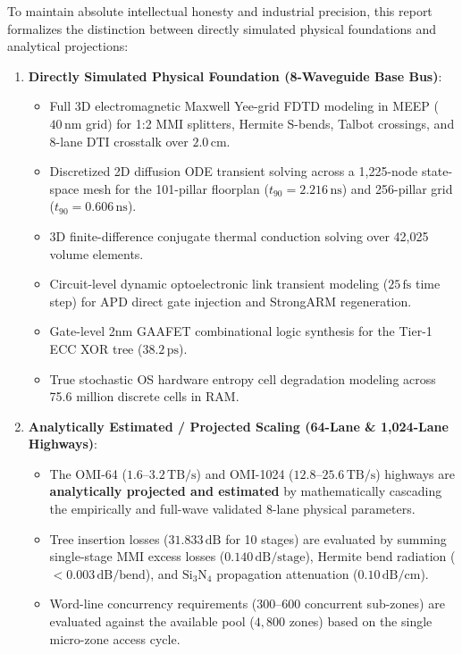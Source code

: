 \documentclass[journal]{IEEEtran}
\begin{document}
To maintain absolute intellectual honesty and industrial precision, this report formalizes the distinction between directly simulated physical foundations and analytical projections:
\begin{enumerate}
    \item \textbf{Directly Simulated Physical Foundation (8-Waveguide Base Bus)}:
    \begin{itemize}
        \item Full 3D electromagnetic Maxwell Yee-grid FDTD modeling in MEEP ($40\,\text{nm}$ grid) for 1:2 MMI splitters, Hermite S-bends, Talbot crossings, and 8-lane DTI crosstalk over $2.0\,\text{cm}$.
        \item Discretized 2D diffusion ODE transient solving across a 1,225-node state-space mesh for the 101-pillar floorplan ($t_{90} = 2.216\,\text{ns}$) and 256-pillar grid ($t_{90} = 0.606\,\text{ns}$).
        \item 3D finite-difference conjugate thermal conduction solving over 42,025 volume elements.
        \item Circuit-level dynamic optoelectronic link transient modeling ($25\,\text{fs}$ time step) for APD direct gate injection and StrongARM regeneration.
        \item Gate-level 2nm GAAFET combinational logic synthesis for the Tier-1 ECC XOR tree ($38.2\,\text{ps}$).
        \item True stochastic OS hardware entropy cell degradation modeling across 75.6 million discrete cells in RAM.
    \end{itemize}
    \item \textbf{Analytically Estimated / Projected Scaling (64-Lane \& 1,024-Lane Highways)}:
    \begin{itemize}
        \item The OMI-64 ($1.6\text{--}3.2\,\text{TB/s}$) and OMI-1024 ($12.8\text{--}25.6\,\text{TB/s}$) highways are \textbf{analytically projected and estimated} by mathematically cascading the empirically and full-wave validated 8-lane physical parameters.
        \item Tree insertion losses ($31.833\,\text{dB}$ for 10 stages) are evaluated by summing single-stage MMI excess losses ($0.140\,\text{dB/stage}$), Hermite bend radiation ($<0.003\,\text{dB/bend}$), and $\text{Si}_3\text{N}_4$ propagation attenuation ($0.10\,\text{dB/cm}$).
        \item Word-line concurrency requirements ($300\text{--}600$ concurrent sub-zones) are evaluated against the available pool ($4,800$ zones) based on the single micro-zone access cycle.
    \end{itemize}
\end{enumerate}
\end{document}
